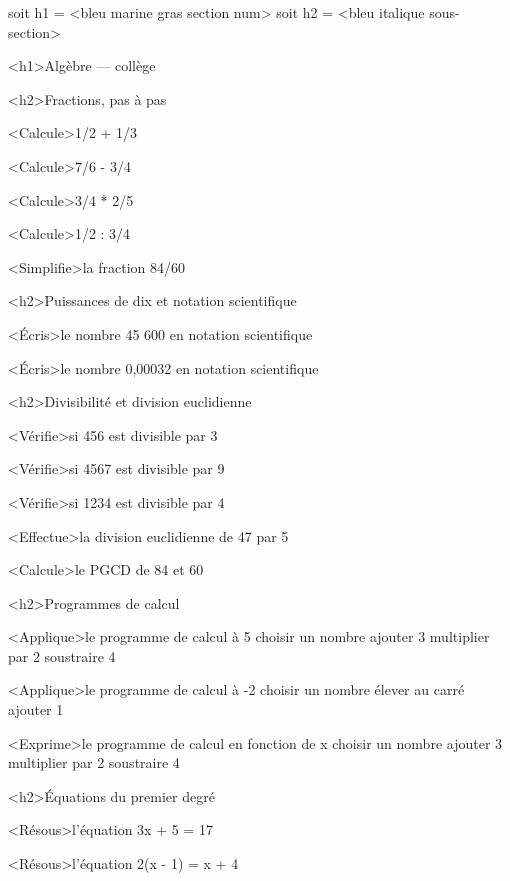 \documentclass[marges=20, taille=11, precision=3]{texecole}
\begin{document}
soit h1 = <bleu marine gras section num>
soit h2 = <bleu italique sous-section>

<h1>Algèbre — collège

<h2>Fractions, pas à pas

<Calcule>1/2 + 1/3

<Calcule>7/6 - 3/4

<Calcule>3/4 * 2/5

<Calcule>1/2 : 3/4

<Simplifie>la fraction 84/60

<h2>Puissances de dix et notation scientifique

<Écris>le nombre 45 600 en notation scientifique

<Écris>le nombre 0,00032 en notation scientifique

<h2>Divisibilité et division euclidienne

<Vérifie>si 456 est divisible par 3

<Vérifie>si 4567 est divisible par 9

<Vérifie>si 1234 est divisible par 4

<Effectue>la division euclidienne de 47 par 5

<Calcule>le PGCD de 84 et 60

<h2>Programmes de calcul

<Applique>le programme de calcul à 5 {
	choisir un nombre
	ajouter 3
	multiplier par 2
	soustraire 4
}

<Applique>le programme de calcul à -2 {
	choisir un nombre
	élever au carré
	ajouter 1
}

<Exprime>le programme de calcul en fonction de x {
	choisir un nombre
	ajouter 3
	multiplier par 2
	soustraire 4
}

<h2>Équations du premier degré

<Résous>l'équation 3x + 5 = 17

<Résous>l'équation 2(x - 1) = x + 4
\end{document}
